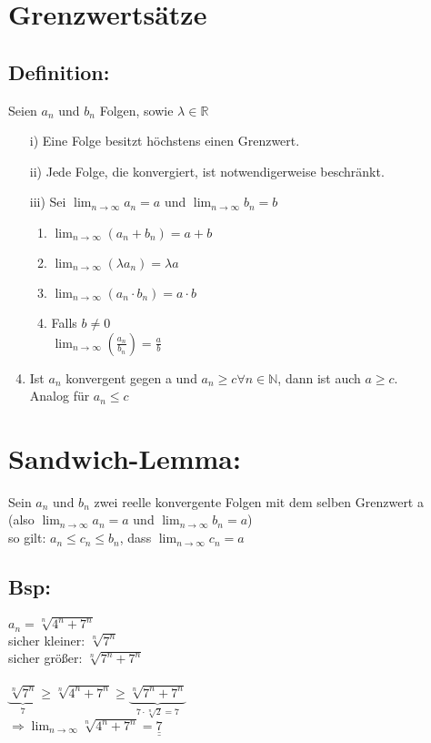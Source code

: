 \documentclass[../mainfile.tex]{subfiles}
\begin{document}
	
	\section{Grenzwertsätze}
	\subsection*{Definition:}
		Seien $a_n$ und $b_n$ Folgen, sowie $\lambda \in \mathbb{R}$
		
		\begin{enumerate}
			\item[i)] Eine Folge besitzt höchstens einen Grenzwert. \\
			\item[ii)] Jede Folge, die konvergiert, ist notwendigerweise beschränkt.\\
			\item[iii)] Sei $\displaystyle \lim_{n\to\infty} a_n = a$ und $\displaystyle\lim_{n\to\infty} b_n = b$
			\begin{enumerate}[label=(\alph*)]
				\item $\displaystyle\lim_{n\to\infty} (a_n+b_n) = a+b$
				\item $\displaystyle\lim_{n\to\infty} (\lambda a_n) = \lambda a$
				\item $\displaystyle\lim_{n\to\infty} (a_n \cdot b_n) = a \cdot b$
				\item Falls $b\neq 0$ \\
				$\displaystyle\lim_{n\to\infty} (\frac{a_n}{b_n}) = \frac{a}{b}$
			\end{enumerate}
			\item Ist $a_n$ konvergent gegen a und $a_n \geqslant c \forall n \in \mathbb{N}$, dann ist auch $a \geqslant c$. \\
			Analog für $a_n \leqslant c$  
		\end{enumerate}
	
	\section{Sandwich-Lemma:} 
		Sein $a_n$ und $b_n$ zwei reelle konvergente Folgen mit dem selben Grenzwert a \\(also $\displaystyle \lim_{n\to\infty} a_n = a$ und $\displaystyle\lim_{n\to\infty} b_n = a$) \\
		so gilt: $a_n \leqslant c_n \leqslant b_n$, dass $\displaystyle\lim_{n\to\infty} c_n = a$ 
	\subsection*{Bsp:}
		$a_n = \sqrt[n]{4^n+7^n}$ \\  
		sicher kleiner: $\sqrt[n]{7^n}$ \\
		sicher größer: $\sqrt[n]{7^n+7^n}$ \\\\
		$\underbrace{\sqrt[n]{7^n}}_{\text{7}} \geqslant \sqrt[n]{4^n+7^n} \geqslant \underbrace{\sqrt[n]{7^n+7^n}}_{7 \cdot \sqrt[n]{2} = 7}$ \\
		$\Rightarrow \displaystyle\lim_{n\to\infty} \sqrt[n]{4^n+7^n} = \underline{\underline{7}}$
		
\end{document}
